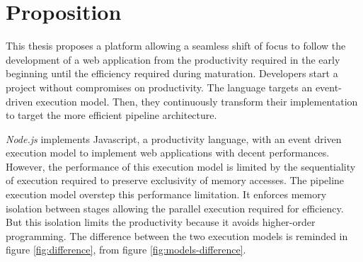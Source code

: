 \section{Proposition} \label{chapter4:proposition}

This thesis proposes a platform allowing a seamless shift of focus to follow the development of a web application from the productivity required in the early beginning until the efficiency required during maturation.
Developers start a project without compromises on productivity.
The language targets an event-driven execution model.
Then, they continuously transform their implementation to target the more efficient pipeline architecture.



\textit{Node.js} implements Javascript, a productivity language, with an event driven execution model to implement web applications with decent performances.
However, the performance of this execution model is limited by the sequentiality of execution required to preserve exclusivity of memory accesses.
The pipeline execution model overstep this performance limitation.
It enforces memory isolation between stages allowing the parallel execution required for efficiency.
But this isolation limits the productivity because it avoids higher-order programming.
The difference between the two execution models is reminded in figure \ref{fig:difference}, from figure \ref{fig:models-difference}.

